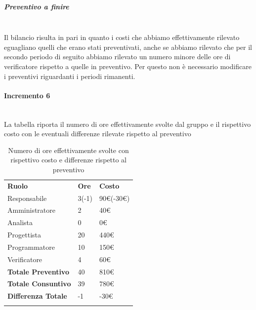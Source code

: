 \subparagraph*{Preventivo a finire} \mbox{} \\
Il bilancio risulta in pari in quanto i costi che abbiamo effettivamente rilevato eguagliano quelli che erano stati preventivati, anche se abbiamo rilevato che per il secondo periodo di seguito abbiamo rilevato un numero minore delle ore di verificatore rispetto a quelle in preventivo. Per questo non è necessario modificare i preventivi riguardanti i periodi rimanenti.



\paragraph*{Incremento 6}  \mbox{} \\
La tabella riporta il numero di ore effettivamente svolte dal gruppo e il rispettivo costo con le eventuali differenze rilevate rispetto al preventivo
\begin{longtable} {							
		>{}p{40mm}  
		>{}p{20mm}	
		>{}p{28mm}			
	}			
	\rowcolor{gray!50}
	
	\textbf{Ruolo}            & \textbf{Ore} & \textbf{Costo}       \TBstrut \\
	Responsabile              & 3(-1)        & 90\euro(-30\euro)    \TBstrut \\
	Amministratore            & 2            & 40\euro              \TBstrut \\
	Analista                  & 0            & 0\euro               \TBstrut \\
	Progettista               & 20           & 440\euro             \TBstrut \\
	Programmatore             & 10           & 150\euro             \TBstrut \\
	Verificatore              & 4            & 60\euro              \TBstrut \\
	\textbf{Totale Preventivo}& 40           & 810\euro             \TBstrut \\	
	\textbf{Totale Consuntivo}& 39           & 780\euro             \TBstrut \\	
	\textbf{Differenza Totale}& -1           & -30\euro             \TBstrut \\
	\rowcolor{white}
	\caption{Numero di ore effettivamente svolte con rispettivo costo e differenze rispetto al preventivo}	
\end{longtable}

